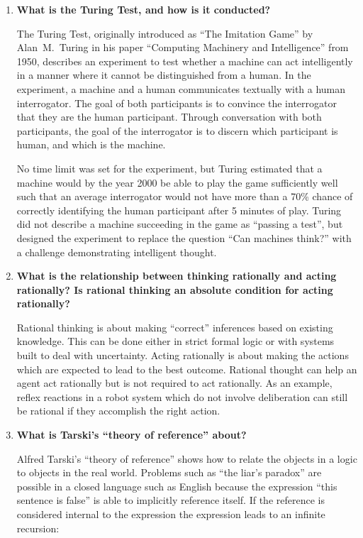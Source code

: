 \begin{enumerate}
\item \textbf{What is the Turing Test, and how is it conducted?}\nopagebreak

The Turing Test, originally introduced as ``The Imitation Game'' by Alan~M.~Turing in his paper ``Computing Machinery and Intelligence'' from 1950, describes an experiment to test whether a machine can act intelligently in a manner where it cannot be distinguished from a human. In the experiment, a machine and a human communicates textually with a human interrogator. The goal of both participants is to convince the interrogator that they are the human participant. Through conversation with both participants, the goal of the interrogator is to discern which participant is human, and which is the machine.

No time limit was set for the experiment, but Turing estimated that a machine would by the year 2000 be able to play the game sufficiently well such that an average interrogator would not have more than a 70\% chance of correctly identifying the human participant after 5 minutes of play. Turing did not describe a machine succeeding in the game as ``passing a test'', but designed the experiment to replace the question ``Can machines think?'' with a challenge demonstrating intelligent thought.

\item \textbf{What is the relationship between thinking rationally and acting rationally? Is rational thinking an absolute condition for acting rationally?}\nopagebreak

Rational thinking is about making ``correct'' inferences based on existing knowledge. This can be done either in strict formal logic or with systems built to deal with uncertainty. Acting rationally is about making the actions which are expected to lead to the best outcome. Rational thought can help an agent act rationally but is not required to act rationally. As an example, reflex reactions in a robot system which do not involve deliberation can still be rational if they accomplish the right action.

\item \textbf{What is Tarski's ``theory of reference'' about?}\nopagebreak

Alfred Tarski's ``theory of reference'' shows how to relate the objects in a logic to objects in the real world. Problems such as ``the liar's paradox'' are possible in a closed language such as English because the expression ``this sentence is false'' is able to implicitly reference itself. If the reference is considered internal to the expression the expression leads to an infinite recursion:


\end{enumerate}
